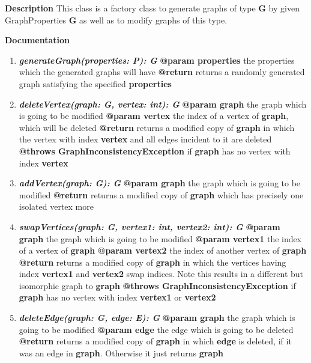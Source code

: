 	
	\textbf{Description}
	This class is a factory class to generate graphs of type \textbf{G} by given GraphProperties \textbf{G} as well as to modify graphs of this type.
	
	\textbf{Documentation}
	\begin{enumerate}[+]
		\item{
			\textbf{\textit{generateGraph(properties: P): G}} \newline
			\textbf{@param properties} the properties which the generated graphs will have \newline
			\textbf{@return} returns a randomly generated graph satisfying the specified \textbf{properties}
		}
		\item{
			\textbf{\textit{deleteVertex(graph: G, vertex: int): G}} \newline
			\textbf{@param graph} the graph which is going to be modified \newline
			\textbf{@param vertex} the index of a vertex of \textbf{graph}, which will be deleted \newline
			\textbf{@return} returns a modified copy of \textbf{graph} in which the vertex with index \textbf{vertex} and all edges incident to it are deleted \newline
			\textbf{@throws GraphInconsistencyException} if \textbf{graph} has no vertex with index \textbf{vertex} 
		}
		\item{
			\textbf{\textit{addVertex(graph: G): G}} \newline
			\textbf{@param graph} the graph which is going to be modified \newline
			\textbf{@return} returns a modified copy of \textbf{graph} which has precisely one isolated vertex more
		}
		\item{
			\textbf{\textit{swapVertices(graph: G, vertex1: int, vertex2: int): G}} \newline
			\textbf{@param graph} the graph which is going to be modified \newline
			\textbf{@param vertex1} the index of a vertex of \textbf{graph} \newline
			\textbf{@param vertex2} the index of another vertex of \textbf{graph} \newline
			\textbf{@return} returns a modified copy of \textbf{graph} in which the vertices having index \textbf{vertex1} and \textbf{vertex2} swap indices. Note this results in a different but isomorphic graph to \textbf{graph}  \newline
			\textbf{@throws GraphInconsistencyException} if \textbf{graph} has no vertex with index \textbf{vertex1} or \textbf{vertex2} 
		}
		\item{
			\textbf{\textit{deleteEdge(graph: G, edge: E): G}} \newline
			\textbf{@param graph} the graph which is going to be modified \newline
			\textbf{@param edge} the edge which is going to be deleted \newline
			\textbf{@return} returns a modified copy of \textbf{graph} in which \textbf{edge} is deleted, if it was an edge in \textbf{graph}. Otherwise it just returns \textbf{graph}
		}
		

\end{enumerate}
